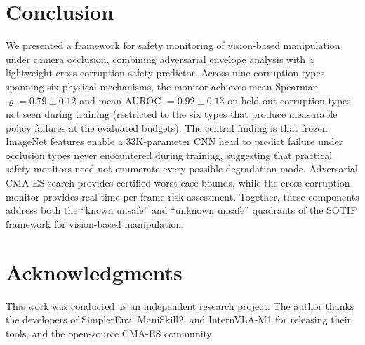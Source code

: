 \documentclass[letterpaper]{IEEEtran}
\renewcommand{\rho}{\varrho}
\begin{document}
\section{Conclusion}
\label{sec:conclusion}

We presented a framework for safety monitoring of vision-based manipulation under camera occlusion, combining adversarial envelope analysis with a lightweight cross-corruption safety predictor.
Across nine corruption types spanning six physical mechanisms, the monitor achieves mean Spearman $\rho = 0.79 \pm 0.12$ and mean AUROC $= 0.92 \pm 0.13$ on held-out corruption types not seen during training (restricted to the six types that produce measurable policy failures at the evaluated budgets).
The central finding is that frozen ImageNet features enable a 33K-parameter CNN head to predict failure under occlusion types never encountered during training, suggesting that practical safety monitors need not enumerate every possible degradation mode.
Adversarial CMA-ES search provides certified worst-case bounds, while the cross-corruption monitor provides real-time per-frame risk assessment.
Together, these components address both the ``known unsafe'' and ``unknown unsafe'' quadrants of the SOTIF framework for vision-based manipulation.

\section*{Acknowledgments}
This work was conducted as an independent research project.
The author thanks the developers of SimplerEnv, ManiSkill2, and InternVLA-M1 for releasing their tools, and the open-source CMA-ES community.



\end{document}
